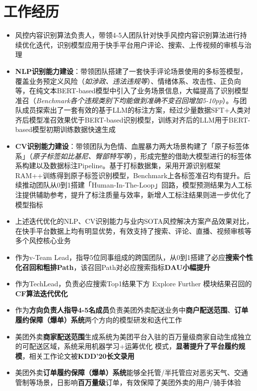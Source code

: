 \documentclass{resume}
\begin{document}
\section{\color{darkgray} 工作经历}
\begin{itemize}
  \item 风控内容识别算法负责人，带领4-5人团队针对快手风控内容识别算法进行持续优化迭代，识别模型应用于快手平台用户评论、搜索、上传视频的审核与治理
  \item \textbf{NLP识别能力建设}：带领团队搭建了一套快手评论场景使用的多标签模型，覆盖业务预定义风险（\textit{如涉政、违法违规等}）、情绪体系、攻击性、正负向等，在纯文本BERT-based模型中引入了业务场景信息，大幅提高了识别模型准召（\textit{Benchmark各个违规类别下均能做到准确不变召回增加5-10pp}）。与团队成员探索出了一套有效的基于LLM的标注方案，经过少量数据SFT+人类对齐后模型准召效果优于BERT-based识别模型，训练对齐后的LLM用于BERT-based模型初期训练数据快速生成
  \item \textbf{CV识别能力建设}：带领团队为色情、血腥暴力两大场景构建了「原子标签体系」（\textit{原子标签如比基尼、臀部特写等}），形成完整的借助大模型进行的标签体系构建以及数据标注Pipeline。基于打标数据集，采用开源识别框架RAM++训练得到原子标签识别模型，Benchmark上各标签准召均有提升。后续推动团队从0到1搭建「Human-In-The-Loop」回路，模型预测结果为人工标注提供辅助参考，提升了标注质量与效率，新增人工标注结果则进一步优化了模型指标
  \item 上述迭代优化的NLP、CV识别能力与业内SOTA风控解决方案产品效果对比，在快手平台数据上均有明显优势，有效支持了搜索、评论、直播、视频审核等多个风控核心业务
\end{itemize}

\begin{itemize}
  \item 作为v-Team Lead，指导5位同事组成的跨国团队，从0到1搭建了必应\texttrademark \textbf{搜索个性化召回和粗排Path}，该召回Path对必应\texttrademark 搜索指标\textbf{DAU小幅提升}
  \item 作为TechLead，负责必应\texttrademark 搜索Top1结果下方 Explore Further 模块结果召回的\textbf{CF算法迭代优化}
\end{itemize}

\begin{itemize}
  \item 作为\textbf{方向负责人指导4-5名成员}负责美团外卖配送业务中\textbf{商户配送范围}、\textbf{订单履约保障（爆单）系统}两个方向的模型研发和迭代工作
  \item 美团外卖\textbf{商家配送范围}生成系统为美团平台入驻的百万量级商家自动生成独立的可配送区域，系统采用机器学习+运筹优化 模式，\textbf{显著提升了平台履约规模}，相关工作论文被\textbf{KDD'20长文录用}
  \item 美团外卖\textbf{订单履约保障（爆单）系统}能够全托管/半托管应对恶劣天气、交通管制等场景，日影响\textbf{百万量级}订单，有效保障了美团外卖的用户/骑手体验
\end{itemize}
\end{document}
